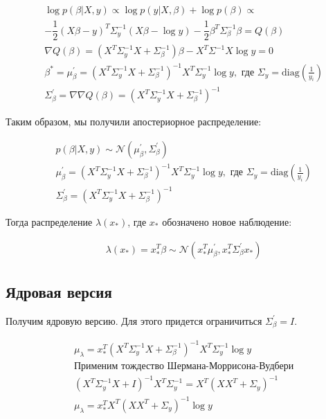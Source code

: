 \begin{equation*}
\begin{aligned}
& \log p(\beta|X, y) \propto \log p(y|X,\beta) + \log p(\beta) \propto \\
& -\dfrac{1}{2}(X\beta - y)^T\Sigma_y^{-1}(X\beta - \log y) - \dfrac{1}{2}\beta^T\Sigma^{-1}_{\beta}\beta  = Q(\beta)\\
& \nabla Q(\beta) = \left(X^T\Sigma^{-1}_y X + \Sigma_{\beta}^{-1}\right)\beta - X^T\Sigma^{-1}X\log y = 0 \\
& \beta^{*} = \mu_{\beta}^{'} = (X^T\Sigma^{-1}_{y}X + \Sigma^{-1}_{\beta})^{-1}X^T\Sigma^{-1}_{y} \log y, \text{ где } \Sigma_{y} =  \text{diag}\left(\frac{1}{y_i}\right) \\
& \Sigma_{\beta}^{'} = \nabla \nabla Q(\beta) = (X^T\Sigma^{-1}_{y}X + \Sigma^{-1}_{\beta})^{-1}
\end{aligned}
\end{equation*}

Таким образом, мы получили апостериорное распределение:

\begin{equation*}
\begin{aligned}
& p(\beta|X, y) \sim \mathcal{N}(\mu_{\beta}^{'}, \Sigma_{\beta}^{'}) \\
& \mu_{\beta}^{'} = (X^T\Sigma^{-1}_{y}X + \Sigma^{-1}_{\beta})^{-1}X^T\Sigma^{-1}_{y} \log y, \text{ где } \Sigma_{y} =  \text{diag}\left(\frac{1}{y_i}\right) \\
& \Sigma_{\beta}^{'} = (X^T\Sigma^{-1}_{y}X + \Sigma^{-1}_{\beta})^{-1}
\end{aligned}
\end{equation*}

Тогда распределение $\lambda(x_{*})$, где $x_{*}$ обозначено новое наблюдение:

\begin{equation*}
\begin{aligned}
& \lambda(x_{*}) = x_{*}^T\beta \sim \mathcal{N}\left(x_{*}^T\mu^{'}_{\beta}, x_{*}^T\Sigma^{'}_{\beta}x_{*}\right)
\end{aligned}
\end{equation*}

\subsection{Ядровая версия}
Получим ядровую версию. Для этого придется ограничиться $\Sigma^{'}_{\beta} = I$.

\begin{equation*}
\begin{aligned}
& \mu_{\lambda} =  x_{*}^T(X^T\Sigma^{-1}_{y}X + \Sigma^{-1}_{\beta})^{-1}X^T\Sigma^{-1}_{y} \log y \\
& \text{Применим тождество Шермана-Моррисона-Вудбери} \\
& (X^T\Sigma^{-1}_{y}X + I)^{-1}X^T\Sigma^{-1}_{y} = X^T(XX^T + \Sigma_y)^{-1} \\
& \mu_{\lambda}  = x_{*}^TX^T(XX^T + \Sigma_y)^{-1}\log y
\end{aligned}
\end{equation*}

